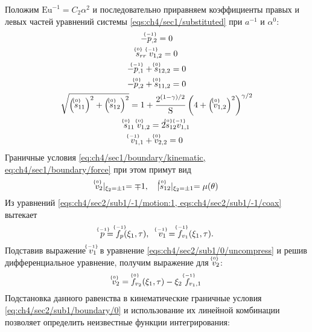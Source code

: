 Положим $\text{Eu}^{-1} = C_2 \alpha^2$ и последовательно приравняем коэффициенты правых и левых частей уравнений системы \cref{eqs:ch4/sec1/substituted} при $a^{-1}$ и $\alpha^0$:
\begin{subequations}
  \label{eqs:ch4/sec2/sub1/main}
  \begin{gather}
    \label{eqs:ch4/sec2/sub1/-1/motion:1}
    -\uindex{p}{-1}_{,2} = 0
    \\
    \label{eqs:ch4/sec2/sub1/-1/coax}
    \uindex{s}{0}_{rr} \; \uindex{v}{-1}_{1,2} = 0
    \\
    \label{eqs:ch4/sec2/sub1/0/motion:1}
    -\uindex{p}{-1}_{,1} + \uindex{s}{0}_{12,2} = 0
    \\
    \label{eqs:ch4/sec2/sub1/0/motion:2}
    -\uindex{p}{0}_{,2} + \uindex{s}{0}_{11,2} = 0
    \\
    \label{eqs:ch4/sec2/sub1/0/plasticity}
    \sqrt{\left(\uindex{s}{0}_{11}\right)^2 + \left(\uindex{s}{0}_{12}\right)^2} = 1 + \frac{2^{(1-\gamma)/2}}{\text{S}} \left(4+\left(\uindex{v}{0}_{1,2}\right)^2\right)^{\gamma/2}
    \\
    \label{eqs:ch4/sec2/sub1/0/coax}
    \uindex{s}{0}_{11} \; \uindex{v}{0}_{1,2} = 2 \uindex{s}{0}_{12} \uindex{v}{-1}_{1,1}
    \\
    \label{eqs:ch4/sec2/sub1/0/uncompress}
    \uindex{v}{-1}_{1,1} + \uindex{v}{0}_{2,2} = 0
  \end{gather}
\end{subequations}
Граничные условия \cref{eq:ch4/sec1/boundary/kinematic, eq:ch4/sec1/boundary/force} при этом примут вид
\begin{equation}
  \label{eq:ch4/sec2/sub1/boundary/0}
  \uindex{v}{0}_{2}\lvert_{\xi_2=\pm 1} = \mp 1, \quad \lvert \uindex{s}{0}_{12}\lvert_{\xi_2=\pm 1} = \mu(\theta)
\end{equation}
Из уравнений \cref{eqs:ch4/sec2/sub1/-1/motion:1, eqs:ch4/sec2/sub1/-1/coax} вытекает
\begin{equation*}
  \uindex{p}{-1} = \uindex{f}{-1}_{p}(\xi_1, \tau), \quad \uindex{v}{-1}_{1} = \uindex{f}{-1}_{v_{1}}(\xi_1, \tau).
\end{equation*}
Подставив выражение $\uindex{v}{-1}_{1}$ в уравнение \cref{eqs:ch4/sec2/sub1/0/uncompress} и решив дифференциальное уравнение, получим выражение для $\uindex{v}{0}_{2}$:
\begin{equation*}
  \uindex{v}{0}_{2} = \uindex{f}{0}_{v_{2}}(\xi_1, \tau) - \xi_2 \ \uindex{f}{-1}_{v_{1},1}
\end{equation*}
Подстановка данного равенства в кинематические граничные условия \cref{eq:ch4/sec2/sub1/boundary/0} и использование их линейной комбинации позволяет определить неизвестные функции интегрирования:
